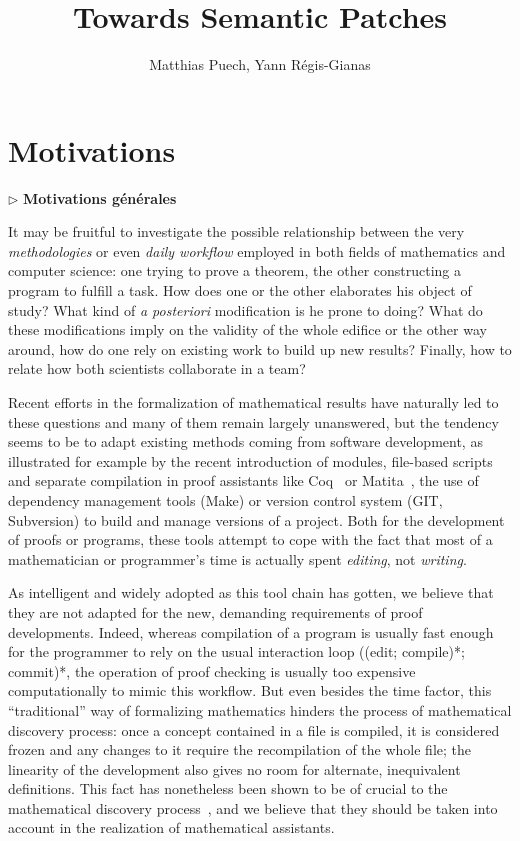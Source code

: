 \documentclass{article}
\title{Towards Semantic Patches}
\author{Matthias Puech, Yann Régis-Gianas}
\date{}
\newcommand{\remplan}[1]{\noindent\textcolor{bwblue}{$\triangleright$ \textbf{#1}}}
\begin{document}
\maketitle

\section{Motivations}

\remplan{Motivations générales}

It may be fruitful to investigate the possible relationship between the
very \emph{methodologies} or even \emph{daily workflow} employed in
both fields of mathematics and computer science: one trying to prove a
theorem, the other constructing a program to fulfill a task. How does
one or the other elaborates his object of study? What kind of \emph{a
  posteriori} modification is he prone to doing? What do these
modifications imply on the validity of the whole edifice or the other
way around, how do one rely on existing work to build up new results?
Finally, how to relate how both scientists collaborate in a team?

Recent efforts in the formalization of mathematical results have
naturally led to these questions and many of them remain largely
unanswered, but the tendency seems to be to adapt existing methods
coming from software development, as illustrated for example by the
recent introduction of modules, file-based scripts and separate
compilation in proof assistants like \textsf{Coq}~{\cite{CoqDocWeb}}
or \textsf{Matita}~{\cite{Asperti06userinteraction}}, the use of
dependency management tools (\textsf{Make}) or version control system
(\textsf{GIT}, \textsf{Subversion}) to build and manage versions of a
project. Both for the development of proofs or programs, these tools
attempt to cope with the fact that most of a mathematician or
programmer's time is actually spent \emph{editing}, not
\emph{writing}.

As intelligent and widely adopted as this tool chain has gotten, we
believe that they are not adapted for the new, demanding requirements
of proof developments. Indeed, whereas compilation of a program is
usually fast enough for the programmer to rely on the usual
interaction loop ((edit; compile)*; commit)*, the operation of proof
checking is usually too expensive computationally to mimic this
workflow. But even besides the time factor, this ``traditional'' way
of formalizing mathematics hinders the process of mathematical
discovery process: once a concept contained in a file is compiled, it
is considered frozen and any changes to it require the recompilation
of the whole file; the linearity of the development also gives no room
for alternate, inequivalent definitions. This fact has nonetheless
been shown to be of crucial to the mathematical discovery
process~\cite{lakatos1964proofs}, and we believe that they should be
taken into account in the realization of mathematical assistants.
\end{document}
